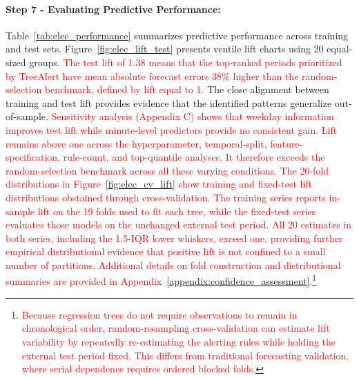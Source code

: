 \documentclass[]{interact}
\newcommand{\matt}[1]{\textcolor{red}{#1}}
\theoremstyle{definition}
\begin{document}
\paragraph*{Step 7 - Evaluating Predictive Performance:}

Table~\ref{tab:elec_performance} summarizes predictive performance across training and test sets. Figure~\ref{fig:elec_lift_test} presents ventile lift charts using 20 equal-sized groups. \matt{The test lift of 1.38 means that the top-ranked periods prioritized by TreeAlert have mean absolute forecast errors 38\% higher than the random-selection benchmark, defined by lift equal to 1.} The close alignment between training and test lift provides evidence that the identified patterns generalize out-of-sample. \matt{Sensitivity analysis (Appendix C) shows that weekday information improves test lift while minute-level predictors provide no consistent gain. Lift remains above one across the hyperparameter, temporal-split, feature-specification, rule-count, and top-quantile analyses. It therefore exceeds the random-selection benchmark across all these varying conditions.}
\matt{The 20-fold distributions in Figure~\ref{fig:elec_cv_lift} show training and fixed-test lift distributions obstained through cross-validation. The training series reports in-sample lift on the 19 folds used to fit each tree, while the fixed-test series evaluates those models on the unchanged external test period. All 20 estimates in both series, including the 1.5-IQR lower whiskers, exceed one, providing further empirical distributional evidence that positive lift is not confined to a small number of partitions. Additional details on fold construction and distributional summaries are provided in Appendix~\ref{appendix:confidence_assessment}.}\footnote{\matt{Because regression trees do not require observations to remain in chronological order, random-resampling cross-validation can estimate lift variability by repeatedly re-estimating the alerting rules while holding the external test period fixed. This differs from traditional forecasting validation, where serial dependence requires ordered blocked folds.}}

\end{document}

